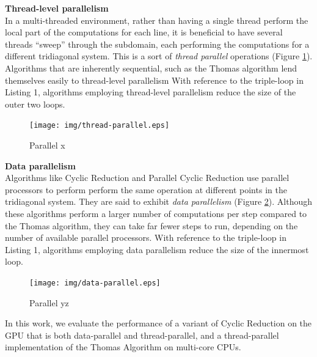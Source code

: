 \documentclass{article}
\begin{document}
    \textbf{Thread-level parallelism} \\
        In a multi-threaded environment,
        rather than having a single thread perform the local part
        of the computations for each line,
        it is beneficial to have several threads ``sweep'' through the subdomain,
        each performing the computations for a different tridiagonal system.
        This is a sort of \emph{thread parallel} operations (Figure \ref{fig:thread-parallel}).
        Algorithms that are inherently sequential,
        such as the Thomas algorithm lend themselves easily to thread-level parallelism
        With reference to the triple-loop in Listing 1,
        algorithms employing thread-level parallelism reduce the
        size of the outer two loops.

        \begin{figure}[h]
        \begin{center}
        \texttt{[image: img/thread-parallel.eps]}
        \end{center}
        \caption{Parallel x}
        \label{fig:thread-parallel}
        \end{figure}

    \textbf{Data parallelism} \\
        Algorithms like Cyclic Reduction and Parallel Cyclic Reduction
        use parallel processors to perform
        perform the same operation at different points in the tridiagonal system.
        They are said to exhibit \emph{data parallelism} (Figure \ref{fig:data-parallel}).
        Although these algorithms perform a larger number of computations
        per step compared to the Thomas algorithm,
        they can take far fewer steps to run,
        depending on the number of available parallel processors.
        With reference to the triple-loop in Listing 1,
        algorithms employing data parallelism reduce the size of the innermost loop.

        \begin{figure}[h]
        \begin{center}
        \texttt{[image: img/data-parallel.eps]}
        \end{center}
        \caption{Parallel yz}
        \label{fig:data-parallel}
        \end{figure}

    In this work, we evaluate the performance of a variant of Cyclic Reduction
    on the GPU that is both data-parallel and thread-parallel,
    and a thread-parallel implementation of the Thomas Algorithm on
    multi-core CPUs.
\end{document}
